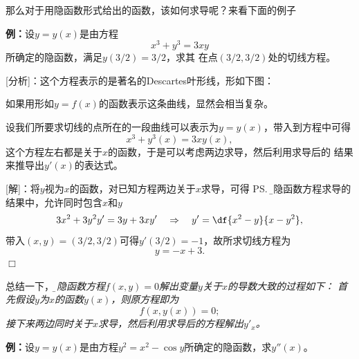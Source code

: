 那么对于用隐函数形式给出的函数，该如何求导呢？来看下面的例子

{\bf 例：}设$y=y(x)$是由方程
$$x^3+y^3=3xy$$
所确定的隐函数，满足$y(3/2)=3/2$，求其
在点$(3/2,3/2)$处的切线方程。

[分析]：这个方程表示的是著名的{\kaishu Descartes叶形线}，形如下图：
\begin{center}
\end{center}
如果用形如$y=f(x)$的函数表示这条曲线，显然会相当复杂。

设我们所要求切线的点所在的一段曲线可以表示为$y=y(x)$，带入到方程中可得
$$x^3+y^3(x)=3xy(x),$$
这个方程左右都是关于$x$的函数，于是可以考虑两边求导，然后利用求导后的
结果来推导出$y'(x)$的表达式。

[解]：将$y$视为$x$的函数，对已知方程两边关于$x$求导，可得
\ps{\b 在隐函数方程求导的结果中，允许同时包含$x$和$y$}
$$3x^2+3y^2y'=3y+3xy'\quad\Rightarrow\quad
y'=\df{x^2-y}{x-y^2},$$
带入$(x,y)=(3/2,3/2)$可得$y'(3/2)=-1$，故所求切线方程为
$$y=-x+3.$$
\hfill$\Box$

总结一下，{\it\b 由隐函数方程$f(x,y)=0$解出变量$y$关于$x$的导数大致的过程如下：
首先假设$y$为$x$的函数$y(x)$，则原方程即为
$$f(x,y(x))=0;$$
接下来两边同时关于$x$求导，然后利用求导后的方程解出$y'_x$。}

{\bf 例：}设$y=y(x)$是由方程$y^2=x^2-\cos y$所确定的隐函数，求$y''(x)$。

